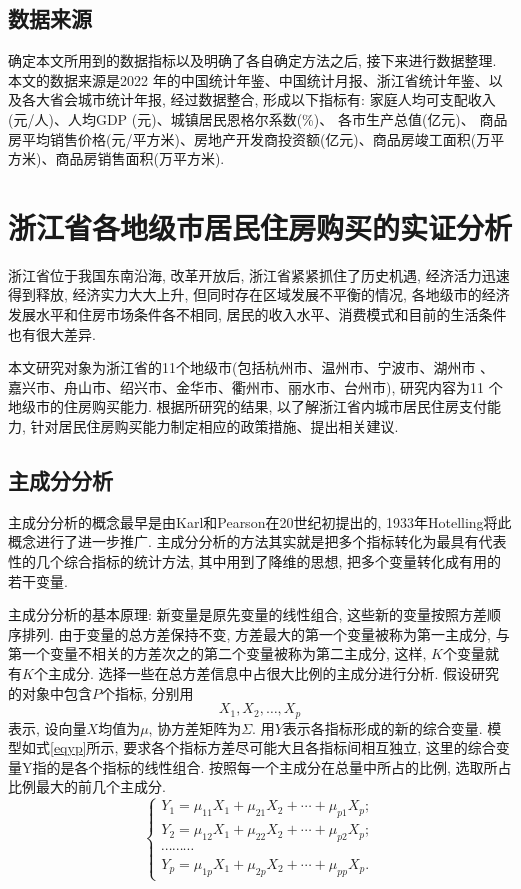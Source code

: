 \documentclass[a4paper, 12pt, twoside]{ctexart}
\begin{document}
 \subsection{数据来源}
确定本文所用到的数据指标以及明确了各自确定方法之后, 接下来进行数据整理. 本文的数据来源是2022 年的中国统计年鉴、中国统计月报、浙江省统计年鉴、以及各大省会城市统计年报, 经过数据整合, 形成以下指标有: 家庭人均可支配收入(元/人)、人均GDP (元)、城镇居民恩格尔系数(\%)、 各市生产总值(亿元)、 商品房平均销售价格(元/平方米)、房地产开发商投资额(亿元)、商品房竣工面积(万平方米)、商品房销售面积(万平方米).


\section{浙江省各地级市居民住房购买的实证分析}
浙江省位于我国东南沿海, 改革开放后, 浙江省紧紧抓住了历史机遇, 经济活力迅速得到释放, 经济实力大大上升, 但同时存在区域发展不平衡的情况, 各地级市的经济发展水平和住房市场条件各不相同, 居民的收入水平、消费模式和目前的生活条件也有很大差异.

本文研究对象为浙江省的11个地级市(包括杭州市、温州市、宁波市、湖州市 、 嘉兴市、舟山市、绍兴市、金华市、衢州市、丽水市、台州市), 研究内容为11 个地级市的住房购买能力. 根据所研究的结果, 以了解浙江省内城市居民住房支付能力, 针对居民住房购买能力制定相应的政策措施、提出相关建议.

\subsection{主成分分析}
    主成分分析的概念最早是由Karl和Pearson在20世纪初提出的, 1933年Hotelling将此概念进行了进一步推广. 主成分分析的方法其实就是把多个指标转化为最具有代表性的几个综合指标的统计方法, 其中用到了降维的思想, 把多个变量转化成有用的若干变量.

    主成分分析的基本原理: 新变量是原先变量的线性组合, 这些新的变量按照方差顺序排列. 由于变量的总方差保持不变, 方差最大的第一个变量被称为第一主成分, 与第一个变量不相关的方差次之的第二个变量被称为第二主成分, 这样, $K$个变量就有$K$个主成分. 选择一些在总方差信息中占很大比例的主成分进行分析. 假设研究的对象中包含$P$个指标, 分别用
        \[X_1, X_2, \ldots, X_p\]
    表示, 设向量$X$均值为$\mu$, 协方差矩阵为$\Sigma$. 用$Y$表示各指标形成的新的综合变量. 模型如式\eqref{eqyp}所示, 要求各个指标方差尽可能大且各指标间相互独立, 这里的综合变量Y指的是各个指标的线性组合. 按照每一个主成分在总量中所占的比例, 选取所占比例最大的前几个主成分.
        \begin{equation}\label{eqyp}
        \begin{cases}
        Y_1=\mu_{11} X_1+\mu_{21} X_2+\cdots+\mu_{p 1} X_p; \\[-5pt]
        Y_2=\mu_{12} X_1+\mu_{22} X_2+\cdots+\mu_{p 2} X_p;\\[-5pt]
        \cdots \cdots \cdots\\[-5pt]
        Y_p=\mu_{1 p} X_1+\mu_{2 p} X_2+\cdots+\mu_{p p} X_p.
        \end{cases}
        \end{equation}
\end{document}
